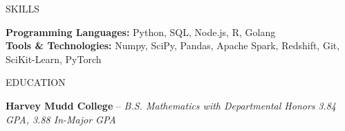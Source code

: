 \documentclass{resume} %
\begin{document}

\begin{rSection}{SKILLS}

\textbf{Programming Languages:} Python, SQL, Node.js, R, Golang\\[0em]
\textbf{Tools \& Technologies:} Numpy, SciPy, Pandas, Apache Spark, Redshift, Git, SciKit-Learn, PyTorch

\end{rSection}


\begin{rSection}{EDUCATION}

{{\bf Harvey Mudd College} -- {\it B.S. Mathematics with Departmental Honors}} \hfill {\em 3.84 GPA, 3.88 In-Major GPA}\\[-1.75em]

\end{rSection}
\end{document}
